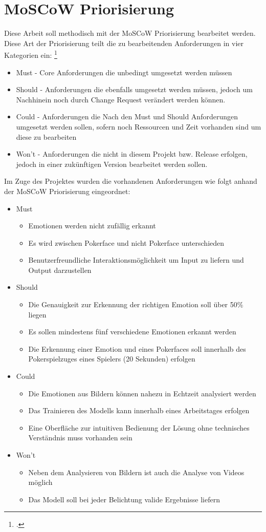 \documentclass[12pt, a4paper]{report}
\begin{document}
\section{MoSCoW Priorisierung}
Diese Arbeit soll methodisch mit der MoSCoW Priorisierung bearbeitet werden. Diese Art der Priorisierung teilt die zu bearbeitenden Anforderungen in vier Kategorien ein:
\footcite[vgl.][90]{Projektmanagement}
\begin{itemize}
\item Must - Core Anforderungen die unbedingt umgesetzt werden müssen
\item Should - Anforderungen die ebenfalls umgesetzt werden müssen, jedoch um Nachhinein noch durch Change Request verändert werden können.
\item Could - Anforderungen die Nach den Must und Should Anforderungen umgesetzt werden sollen, sofern noch Ressourcen und Zeit vorhanden sind um diese zu bearbeiten
\item Won't - Anforderungen die nicht in diesem Projekt bzw. Release erfolgen, jedoch in einer zukünftigen Version bearbeitet werden sollen. 
\end{itemize}
Im Zuge des Projektes wurden die vorhandenen Anforderungen wie folgt anhand der MoSCoW Priorisierung eingeordnet:
\begin{itemize}
\item Must
\begin{itemize}
\item Emotionen werden nicht zufällig erkannt
\item Es wird zwischen Pokerface und nicht Pokerface unterschieden
\item Benutzerfreundliche Interaktionsmöglichkeit um Input zu liefern und Output darzustellen
\end{itemize}
\item Should
\begin{itemize}
\item Die Genauigkeit zur Erkennung der richtigen Emotion soll über 50\% liegen
\item Es sollen mindestens fünf verschiedene Emotionen erkannt werden
\item Die Erkennung einer Emotion und eines Pokerfaces soll innerhalb des Pokerspielzuges eines Spielers (20 Sekunden) erfolgen
\end{itemize}
\item Could
\begin{itemize}
\item Die Emotionen aus Bildern können nahezu in Echtzeit analysiert werden
\item Das Trainieren des Modells kann innerhalb eines Arbeitstages erfolgen
\item Eine Oberfläche zur intuitiven Bedienung der Lösung ohne technisches Verständnis muss vorhanden sein
\end{itemize}
\item Won't
\begin{itemize}
\item Neben dem Analysieren von Bildern ist auch die Analyse von Videos möglich
\item Das Modell soll bei jeder Belichtung valide Ergebnisse liefern
\end{itemize}
\end{itemize}
\end{document}
